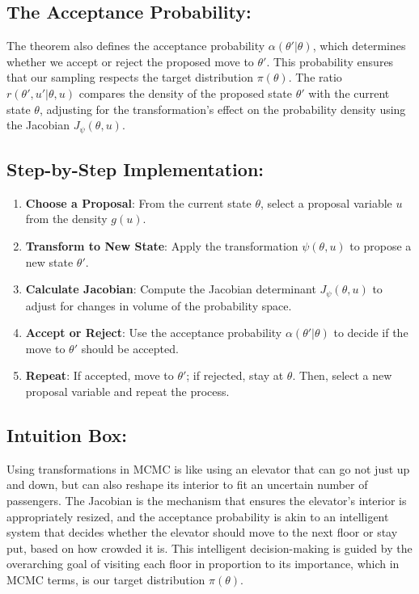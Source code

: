 \documentclass[10pt]{article}
\begin{document}
\subsection*{The Acceptance Probability:}
The theorem also defines the acceptance probability \(\alpha(\theta'|\theta)\), which determines whether we accept or reject the proposed move to \(\theta'\). This probability ensures that our sampling respects the target distribution \(\pi(\theta)\). The ratio \(r(\theta', u'|\theta, u)\) compares the density of the proposed state \(\theta'\) with the current state \(\theta\), adjusting for the transformation's effect on the probability density using the Jacobian \(J_{\psi}(\theta, u)\).

\subsection*{Step-by-Step Implementation:}
\begin{enumerate}
  \item \textbf{Choose a Proposal}: From the current state \(\theta\), select a proposal variable \(u\) from the density \(g(u)\).
  \item \textbf{Transform to New State}: Apply the transformation \(\psi(\theta, u)\) to propose a new state \(\theta'\).
  \item \textbf{Calculate Jacobian}: Compute the Jacobian determinant \(J_{\psi}(\theta, u)\) to adjust for changes in volume of the probability space.
  \item \textbf{Accept or Reject}: Use the acceptance probability \(\alpha(\theta'|\theta)\) to decide if the move to \(\theta'\) should be accepted.
  \item \textbf{Repeat}: If accepted, move to \(\theta'\); if rejected, stay at \(\theta\). Then, select a new proposal variable and repeat the process.
\end{enumerate}

\subsection*{Intuition Box:}
Using transformations in MCMC is like using an elevator that can go not just up and down, but can also reshape its interior to fit an uncertain number of passengers. The Jacobian is the mechanism that ensures the elevator's interior is appropriately resized, and the acceptance probability is akin to an intelligent system that decides whether the elevator should move to the next floor or stay put, based on how crowded it is. This intelligent decision-making is guided by the overarching goal of visiting each floor in proportion to its importance, which in MCMC terms, is our target distribution \(\pi(\theta)\).
\end{document}
